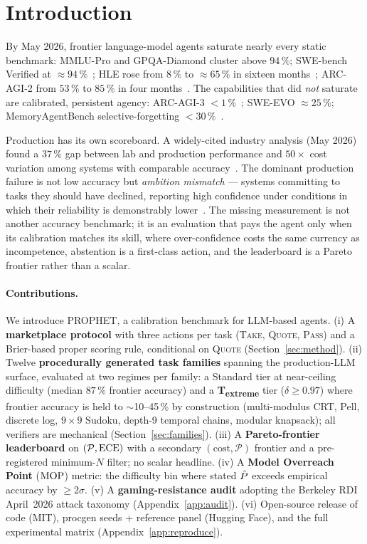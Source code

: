 \section{Introduction}\label{sec:intro}

By May 2026, frontier language-model agents saturate nearly every
static benchmark: MMLU-Pro and GPQA-Diamond cluster above $94\,\%$;
SWE-bench Verified at $\approx 94\,\%$~\cite{swebench}; HLE rose from
$8\,\%$ to $\approx 65\,\%$ in sixteen months~\cite{hle}; ARC-AGI-2 from
$53\,\%$ to $85\,\%$ in four months~\cite{arcagi2}. The capabilities
that did \emph{not} saturate are calibrated, persistent agency:
ARC-AGI-3 $<1\,\%$~\cite{arcagi3}; SWE-EVO $\approx 25\,\%$;
MemoryAgentBench selective-forgetting $<30\,\%$~\cite{memoryagentbench}.

Production has its own scoreboard. A widely-cited industry analysis
(May 2026) found a $37\,\%$ gap between lab and production performance
and $50\times$ cost variation among systems with comparable
accuracy~\cite{cognition_devin_2025}. The dominant production failure
is not low accuracy but \emph{ambition mismatch} --- systems committing
to tasks they should have declined, reporting high confidence under
conditions in which their reliability is demonstrably
lower~\cite{anthropic_faithfulness}. The missing measurement is not
another accuracy benchmark; it is an evaluation that pays the agent
only when its calibration matches its skill, where over-confidence
costs the same currency as incompetence, abstention is a first-class
action, and the leaderboard is a Pareto frontier rather than a scalar.

\paragraph{Contributions.} We introduce \textsc{PROPHET}, a
calibration benchmark for LLM-based agents.
(i) A \textbf{marketplace protocol} with three actions per task
(\textsc{Take}, \textsc{Quote}, \textsc{Pass}) and a Brier-based proper
scoring rule, conditional on \textsc{Quote}
(Section~\ref{sec:method}).
(ii) Twelve \textbf{procedurally generated task families} spanning the
production-LLM surface, evaluated at two regimes per family: a Standard
tier at near-ceiling difficulty (median $87\,\%$ frontier accuracy) and
a \textbf{T\textsubscript{extreme}} tier ($\delta \ge 0.97$) where
frontier accuracy is held to $\sim$10--45\,\% by construction
(multi-modulus CRT, Pell, discrete log, $9\times 9$ Sudoku, depth-9
temporal chains, modular knapsack); all verifiers are mechanical
(Section~\ref{sec:families}).
(iii) A \textbf{Pareto-frontier leaderboard} on
$(\mathcal{P}, \mathrm{ECE})$ with a secondary $(\text{cost}, \mathcal{P})$
frontier and a pre-registered minimum-$N$ filter; no scalar headline.
(iv) A \textbf{Model Overreach Point} ($\mathrm{MOP}$) metric: the difficulty
bin where stated $\hat{P}$ exceeds empirical accuracy by $\ge 2\sigma$.
(v) A \textbf{gaming-resistance audit} adopting the Berkeley RDI
April~2026 attack taxonomy (Appendix~\ref{app:audit}).
(vi) Open-source release of code (MIT), procgen seeds + reference panel
(Hugging Face), and the full experimental matrix
(Appendix~\ref{app:reproduce}).

